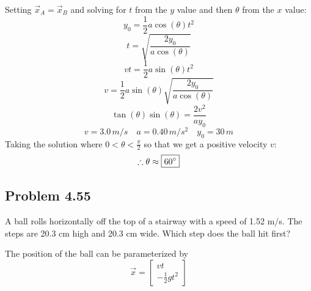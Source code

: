 \documentclass[12pt]{article}
\begin{document}
Setting $\vec{x}_A = \vec{x}_B$ and solving for $t$ from the $y$ value and then $\theta$ from the $x$ value:
\[y_0 = \frac{1}{2} a \cos(\theta) t^2\]
\[t = \sqrt{\frac{2 y_0}{a \cos(\theta)}}\]
\[vt = \frac{1}{2} a \sin(\theta) t^2\]
\[v = \frac{1}{2} a \sin(\theta)\sqrt{\frac{2 y_0}{a \cos(\theta)}}\]
\[\tan(\theta) \sin(\theta) = {\frac{2v^2}{a y_0}}\]
\[v = 3.0\,\si{m/s}\quad a = 0.40\,\si{m/s^2}\quad y_0 = 30\,\si{m}\]
Taking the solution where $0 < \theta < \frac{\pi}{2}$ so that we get a positive velocity $v$:
\[\therefore \theta \approx \boxed{60\degree}\]

\newpage
\subsection{Problem 4.55}
A ball rolls horizontally off the top of a stairway with a speed of 1.52 m/s. The steps are 20.3 cm high and 20.3 cm wide.
Which step does the ball hit first? \newline

The position of the ball can be parameterized by
\[\vec{x} = \begin{bmatrix}v t \\ -\frac{1}{2}g t^2\end{bmatrix}\]
\end{document}
